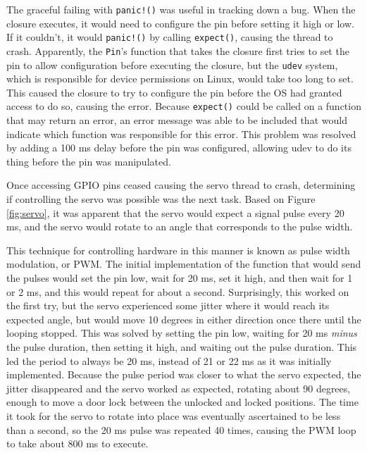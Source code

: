 \documentclass[a4paper]{article}
\begin{document}
The graceful failing with \texttt{panic!()} was useful in tracking down a bug.
When the closure executes, it would need to configure the pin before setting it high or low.
If it couldn't, it would \texttt{panic!()} by calling \texttt{expect()}, causing the thread to crash.
Apparently, the \texttt{Pin}'s function that takes the closure first tries to set the pin to allow configuration before executing the closure, but the \texttt{udev} system, which is responsible for device permissions on Linux, would take too long to set.
This caused the closure to try to configure the pin before the OS had granted access to do so, causing the error.
Because \texttt{expect()} could be called on a function that may return an error, an error message was able to be included that would indicate which function was responsible for this error.
This problem was resolved by adding a 100 ms delay before the pin was configured, allowing udev to do its thing before the pin was manipulated.


Once accessing GPIO pins ceased causing the servo thread to crash, determining if controlling the servo was possible was the next task.
Based on Figure \ref{fig:servo}, it was apparent that the servo would expect a signal pulse every 20 ms, and the servo would rotate to an angle that corresponds to the pulse width.



This technique for controlling hardware in this manner is known as pulse width modulation, or PWM.
The initial implementation of the function that would send the pulses would set the pin low, wait for 20 ms, set it high, and then wait for 1 or 2 ms, and this would repeat for about a second.
Surprisingly, this worked on the first try, but the servo experienced some jitter where it would reach its expected angle, but would move 10 degrees in either direction once there until the looping stopped.
This was solved by setting the pin low, waiting for 20 ms \emph{minus} the pulse duration, then setting it high, and waiting out the pulse duration.
This led the period to always be 20 ms, instead of 21 or 22 ms as it was initially implemented.
Because the pulse period was closer to what the servo expected, the jitter disappeared and the servo worked as expected, rotating about 90 degrees, enough to move a door lock between the unlocked and locked positions.
The time it took for the servo to rotate into place was eventually ascertained to be less than a second, so the 20 ms pulse was repeated 40 times, causing the PWM loop to take about 800 ms to execute.
\end{document}
